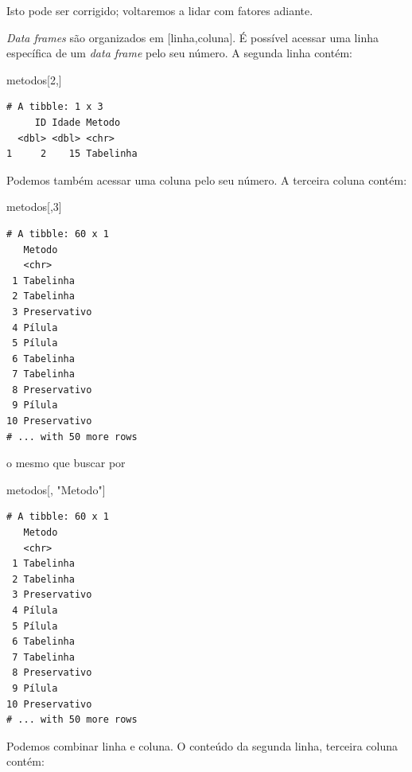 \documentclass[
]{article}
\newenvironment{Shaded}{\begin{snugshade}}{\end{snugshade}}
\newcommand{\DecValTok}[1]{\textcolor[rgb]{0.00,0.00,0.81}{#1}}
\newcommand{\NormalTok}[1]{#1}
\newcommand{\StringTok}[1]{\textcolor[rgb]{0.31,0.60,0.02}{#1}}
\begin{document}
Isto pode ser corrigido; voltaremos a lidar com fatores adiante.

\emph{Data frames} são organizados em {[}linha,coluna{]}. É possível
acessar uma linha específica de um \emph{data frame} pelo seu número. A
segunda linha contém:

\begin{Shaded}
\begin{Highlighting}[]
\NormalTok{metodos[}\DecValTok{2}\NormalTok{,]}
\end{Highlighting}
\end{Shaded}

\begin{verbatim}
# A tibble: 1 x 3
     ID Idade Metodo   
  <dbl> <dbl> <chr>    
1     2    15 Tabelinha
\end{verbatim}

Podemos também acessar uma coluna pelo seu número. A terceira coluna
contém:

\begin{Shaded}
\begin{Highlighting}[]
\NormalTok{metodos[,}\DecValTok{3}\NormalTok{]}
\end{Highlighting}
\end{Shaded}

\begin{verbatim}
# A tibble: 60 x 1
   Metodo      
   <chr>       
 1 Tabelinha   
 2 Tabelinha   
 3 Preservativo
 4 Pílula      
 5 Pílula      
 6 Tabelinha   
 7 Tabelinha   
 8 Preservativo
 9 Pílula      
10 Preservativo
# ... with 50 more rows
\end{verbatim}

o mesmo que buscar por

\begin{Shaded}
\begin{Highlighting}[]
\NormalTok{metodos[, }\StringTok{"Metodo"}\NormalTok{]}
\end{Highlighting}
\end{Shaded}

\begin{verbatim}
# A tibble: 60 x 1
   Metodo      
   <chr>       
 1 Tabelinha   
 2 Tabelinha   
 3 Preservativo
 4 Pílula      
 5 Pílula      
 6 Tabelinha   
 7 Tabelinha   
 8 Preservativo
 9 Pílula      
10 Preservativo
# ... with 50 more rows
\end{verbatim}

Podemos combinar linha e coluna. O conteúdo da segunda linha, terceira
coluna contém:
\end{document}
